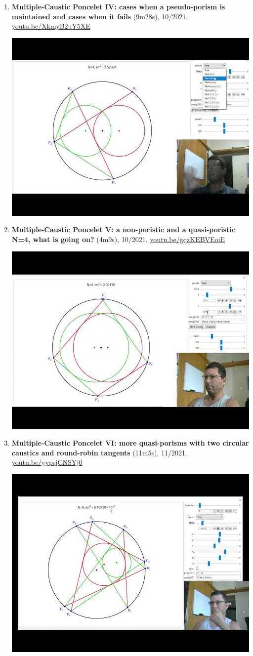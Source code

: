 \documentclass[12pt]{article}
\begin{document}
\begin{enumerate}[resume]
% 
\item \textbf{Multiple-Caustic Poncelet IV: cases when a pseudo-porism is maintained and cases when it fails} (9m28s), 10/2021. \href{https://youtu.be/XkmyB2uY5XE}{\url{youtu.be/XkmyB2uY5XE}}
\begin{center}\includegraphics[width=.5\textwidth]{pics/XkmyB2uY5XE.jpg}\end{center}
% 
\item \textbf{Multiple-Caustic Poncelet V: a non-poristic and a quasi-poristic N=4, what is going on?} (4m9s), 10/2021. \href{https://youtu.be/gqzKEBVEoiE}{\url{youtu.be/gqzKEBVEoiE}}
\begin{center}\includegraphics[width=.5\textwidth]{pics/gqzKEBVEoiE.jpg}\end{center}
% 
\item \textbf{Multiple-Caustic Poncelet VI: more quasi-porisms with two circular caustics and round-robin tangents} (11m5s), 11/2021. \href{https://youtu.be/yypsjCNSYj0}{\url{youtu.be/yypsjCNSYj0}}
\begin{center}\includegraphics[width=.5\textwidth]{pics/yypsjCNSYj0.jpg}\end{center}
% 
\end{enumerate}
\end{document}
